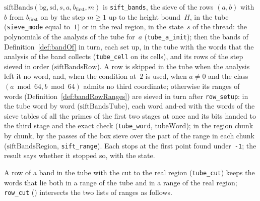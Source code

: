 \begin{definition}\label{def:siftBands}
  \leanok
  $\mathrm{siftBands}(\mathrm{bg}, \mathrm{sd}, s, a, b_{\mathrm{first}}, m)$ is
  \texttt{sift\_bands}, the sieve of the rows $(a, b)$ with~$b$ from $b_{\mathrm{first}}$ on by the
  step $m \ge 1$ up to the height bound~$H$, in the tube (\texttt{sieve\_mode} equal to~$1$) or in
  the real region, in the state~$s$ of the thread: the polynomials of the analysis of the tube for~$a$
  (\texttt{tube\_a\_init}); then the bands of Definition~\ref{def:bandOf} in turn, each set up, in
  the tube with the words that the analysis of the band collects (\texttt{tube\_cell} on its
  cells), and its rows of the step sieved in order ($\mathrm{siftBandsRow}$). A row is skipped in
  the tube when the analysis left it no word, and, when the condition at~$2$ is used, when $a \ne 0$
  and the class $(a \bmod 64, b \bmod 64)$ admits no third coordinate; otherwise its ranges of words
  (Definition~\ref{def:bandRowRanges}) are sieved in turn after \texttt{row\_setup}: in the tube word
  by word ($\mathrm{siftBandsTube}$), each word and-ed with the words of the sieve tables of all the
  primes of the first two stages at once and its bits handed to the third stage and the exact check
  (\texttt{tube\_word}, $\mathrm{tubeWord}$); in the region chunk by chunk, by the passes of the box
  sieve over the part of the range in each chunk ($\mathrm{siftBandsRegion}$, \texttt{sift\_range}).
  Each stops at the first point found under~\texttt{-1}; the result says whether it stopped so, with
  the state.
\end{definition}


A row of a band in the tube with the cut to the real region (\texttt{tube\_cut}) keeps the words
that lie both in a range of the tube and in a range of the real region; \texttt{row\_cut}
() intersects the two lists of ranges as follows.


